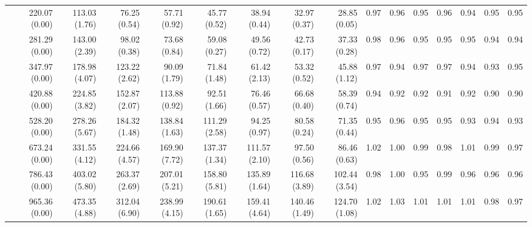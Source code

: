 \documentclass[preprint]{tlp}
\begin{document}
\begin{landscape}
\begin{tabular}{@{\extracolsep{\fill}}|c|r|r|r|r|r|r|r|r||r|r|r|r|r|r|r|}
 & 220.07 (0.00) &  113.03 (1.76) &  76.25 (0.54) &  57.71 (0.92) &  45.77 (0.52) &  38.94 (0.44) &  32.97 (0.37) &  28.85 (0.05) & 0.97 & 0.96 & 0.95 & 0.96 & 0.94 & 0.95 & 0.95 \\
 & 281.29 (0.00) &  143.00 (2.39) &  98.02 (0.38) &  73.68 (0.84) &  59.08 (0.27) &  49.56 (0.72) &  42.73 (0.17) &  37.33 (0.28) & 0.98 & 0.96 & 0.95 & 0.95 & 0.95 & 0.94 & 0.94 \\
 & 347.97 (0.00) &  178.98 (4.07) &  123.22 (2.62) &  90.09 (1.79) &  71.84 (1.48) &  61.42 (2.13) &  53.32 (0.52) &  45.88 (1.12) & 0.97 & 0.94 & 0.97 & 0.97 & 0.94 & 0.93 & 0.95 \\
 & 420.88 (0.00) &  224.85 (3.82) &  152.87 (2.07) &  113.88 (0.92) &  92.51 (1.66) &  76.46 (0.57) &  66.68 (0.40) &  58.39 (0.74) & 0.94 & 0.92 & 0.92 & 0.91 & 0.92 & 0.90 & 0.90 \\
 & 528.20 (0.00) &  278.26 (5.67) &  184.32 (1.48) &  138.84 (1.63) &  111.29 (2.58) &  94.25 (0.97) &  80.58 (0.24) &  71.35 (0.44) & 0.95 & 0.96 & 0.95 & 0.95 & 0.93 & 0.94 & 0.93 \\
 & 673.24 (0.00) &  331.55 (4.12) &  224.66 (4.57) &  169.90 (7.72) &  137.37 (1.34) &  111.57 (2.10) &  97.50 (0.56) &  86.46 (0.63) & 1.02 & 1.00 & 0.99 & 0.98 & 1.01 & 0.99 & 0.97 \\
 & 786.43 (0.00) &  403.02 (5.80) &  263.37 (2.69) &  207.01 (5.21) &  158.80 (5.81) &  135.89 (1.64) &  116.68 (3.89) &  102.44 (3.54) & 0.98 & 1.00 & 0.95 & 0.99 & 0.96 & 0.96 & 0.96 \\
 & 965.36 (0.00) &  473.35 (4.88) &  312.04 (6.90) &  238.99 (4.15) &  190.61 (1.65) &  159.41 (4.64) &  140.46 (1.49) &  124.70 (1.08) & 1.02 & 1.03 & 1.01 & 1.01 & 1.01 & 0.98 & 0.97 \\


\end{tabular}
\end{landscape}
\end{document}
